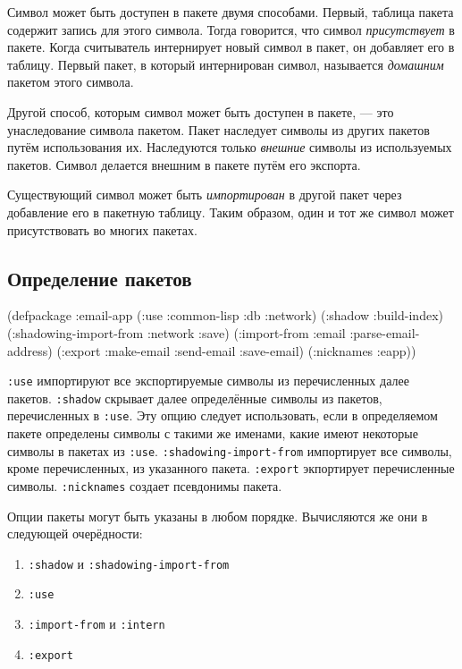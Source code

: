 Символ может быть доступен в пакете двумя способами. Первый, таблица пакета содержит запись для этого символа. Тогда говорится, что символ \emph{присутствует} в пакете. Когда считыватель интернирует новый символ в пакет, он добавляет его в таблицу. Первый пакет, в который интернирован символ, называется \emph{домашним} пакетом этого символа.

Другой способ, которым символ может быть доступен в пакете, — это унаследование символа пакетом. Пакет наследует символы из других пакетов путём использования их. Наследуются только \emph{внешние} символы из используемых пакетов. Символ делается внешним в пакете путём его экспорта.

Существующий символ может быть \emph{импортирован} в другой пакет через добавление его в пакетную таблицу. Таким образом, один и тот же символ может присутствовать во многих пакетах.

\subsection{Определение пакетов}
\begin{cllst}{}{}
(defpackage :email-app
  (:use :common-lisp :db :network)
  (:shadow :build-index)
  (:shadowing-import-from :network :save)
  (:import-from :email :parse-email-address)
  (:export :make-email
           :send-email
           :save-email)
  (:nicknames :eapp))
\end{cllst}

\lstinline{:use} импортируют все экспортируемые символы из перечисленных далее пакетов. \lstinline{:shadow} скрывает далее определённые символы из пакетов, перечисленных в \lstinline{:use}. Эту опцию следует использовать, если в определяемом пакете определены символы с такими же именами, какие имеют некоторые символы в пакетах из \lstinline{:use}. \lstinline{:shadowing-import-from} импортирует все символы, кроме перечисленных, из указанного пакета. \lstinline{:export} экпортирует перечисленные символы. \lstinline{:nicknames} создает псевдонимы пакета.

Опции пакеты могут быть указаны в любом порядке. Вычисляются же они в следующей очерёдности:
\begin{enumerate}
  \item \lstinline{:shadow} и \lstinline{:shadowing-import-from}
  \item \lstinline{:use}
  \item \lstinline{:import-from} и \lstinline{:intern}
  \item \lstinline{:export}
\end{enumerate}

